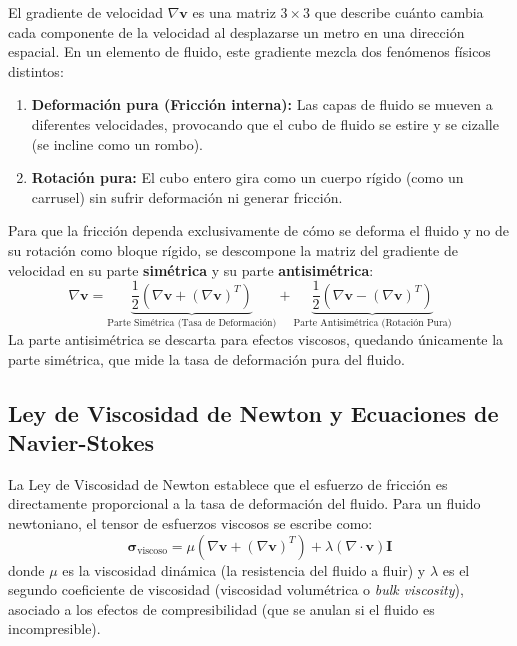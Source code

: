 \documentclass[11pt,letterpaper]{article}
\begin{document}
El gradiente de velocidad $\nabla \mathbf{v}$ es una matriz $3 \times 3$ que describe cuánto cambia cada componente de la velocidad al desplazarse un metro en una dirección espacial. En un elemento de fluido, este gradiente mezcla dos fenómenos físicos distintos:
\begin{enumerate}
    \item \textbf{Deformación pura (Fricción interna):} Las capas de fluido se mueven a diferentes velocidades, provocando que el cubo de fluido se estire y se cizalle (se incline como un rombo).
    \item \textbf{Rotación pura:} El cubo entero gira como un cuerpo rígido (como un carrusel) sin sufrir deformación ni generar fricción.
\end{enumerate}

Para que la fricción dependa exclusivamente de cómo se deforma el fluido y no de su rotación como bloque rígido, se descompone la matriz del gradiente de velocidad en su parte \textbf{simétrica} y su parte \textbf{antisimétrica}:
\begin{equation}
    \nabla \mathbf{v} = \underbrace{\frac{1}{2}\left(\nabla \mathbf{v} + (\nabla \mathbf{v})^T\right)}_{\text{Parte Simétrica (Tasa de Deformación)}} + \underbrace{\frac{1}{2}\left(\nabla \mathbf{v} - (\nabla \mathbf{v})^T\right)}_{\text{Parte Antisimétrica (Rotación Pura)}}
\end{equation}
La parte antisimétrica se descarta para efectos viscosos, quedando únicamente la parte simétrica, que mide la tasa de deformación pura del fluido.

\subsection{Ley de Viscosidad de Newton y Ecuaciones de Navier-Stokes}

La Ley de Viscosidad de Newton establece que el esfuerzo de fricción es directamente proporcional a la tasa de deformación del fluido. Para un fluido newtoniano, el tensor de esfuerzos viscosos se escribe como:
\begin{equation}
    \boldsymbol{\sigma}_{\text{viscoso}} = \mu \left( \nabla \mathbf{v} + (\nabla \mathbf{v})^T \right) + \lambda (\nabla \cdot \mathbf{v})\mathbf{I}
\end{equation}
donde $\mu$ es la viscosidad dinámica (la resistencia del fluido a fluir) y $\lambda$ es el segundo coeficiente de viscosidad (viscosidad volumétrica o \textit{bulk viscosity}), asociado a los efectos de compresibilidad (que se anulan si el fluido es incompresible).
\end{document}
